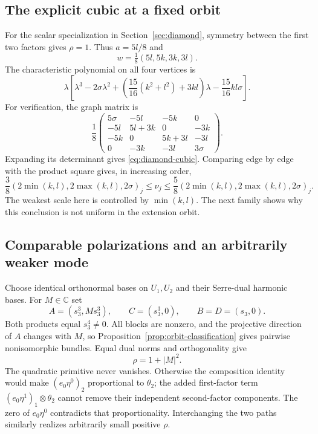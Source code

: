 \documentclass[11pt]{amsart}
\theoremstyle{definition}
\theoremstyle{remark}
\newcommand{\CC}{\mathbb C}
\begin{document}
\subsection{The explicit cubic at a fixed orbit}
For the scalar specialization in Section~\ref{sec:diamond}, symmetry
between the first two factors gives $\rho=1$. Thus $a=5l/8$ and
\begin{equation}\label{eq:rho-one-weights}
 w=\tfrac18(5l,5k,3k,3l).
\end{equation}
The characteristic polynomial on all four vertices is
\begin{equation}\label{eq:diamond-cubic}
 \lambda\left[\lambda^3-2\sigma\lambda^2+
 \left(\frac{15}{16}(k^2+l^2)+3kl\right)\lambda
 -\frac{15}{16}kl\sigma\right].
\end{equation}
For verification, the graph matrix is
\[
 \frac18\begin{pmatrix}
 5\sigma&-5l&-5k&0\\
 -5l&5l+3k&0&-3k\\
 -5k&0&5k+3l&-3l\\
 0&-3k&-3l&3\sigma
 \end{pmatrix}.
\]
Expanding its determinant gives \eqref{eq:diamond-cubic}. Comparing
edge by edge with the product square gives, in increasing order,
\[
 \frac38(2\min(k,l),2\max(k,l),2\sigma)_j
 \le\nu_j\le
 \frac58(2\min(k,l),2\max(k,l),2\sigma)_j.
\]
The weakest scale here is controlled by $\min(k,l)$. The next family
shows why this conclusion is not uniform in the extension orbit.

\subsection{Comparable polarizations and an arbitrarily weaker mode}
Choose identical orthonormal bases on $U_1,U_2$ and their Serre-dual
harmonic bases. For $M\in\CC$ set
\begin{equation}\label{eq:M-family}
 A=(s_3^3,Ms_3^3),\qquad C=(s_3^3,0),\qquad B=D=(s_3,0).
\end{equation}
Both products equal $s_3^4\ne0$. All blocks are nonzero, and the
projective direction of $A$ changes with $M$, so
Proposition~\ref{prop:orbit-classification} gives pairwise nonisomorphic
bundles. Equal dual norms and orthogonality give
\begin{equation}\label{eq:M-rho}
 \rho=1+|M|^2.
\end{equation}
The quadratic primitive never vanishes. Otherwise the composition identity
would make $(e_0\eta^0)_2$ proportional to $\theta_2$; the added
first-factor term $(e_0\eta^1)_1\otimes\theta_2$ cannot remove their
independent second-factor components. The zero of $e_0\eta^0$ contradicts
that proportionality. Interchanging the two paths similarly realizes
arbitrarily small positive $\rho$.
\end{document}
